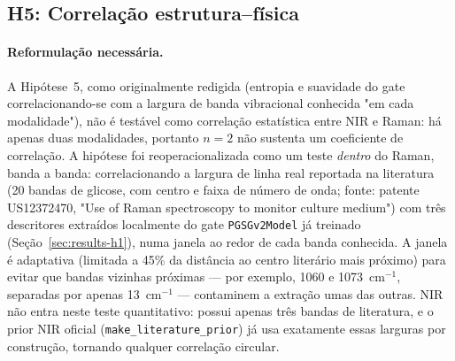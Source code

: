 %
%

\subsection{H5: Correlação estrutura--física}
\label{sec:results-h5}

\paragraph{Reformulação necessária.} A Hipótese~5, como originalmente redigida (entropia e suavidade do gate correlacionando-se com a largura de banda vibracional conhecida "em cada modalidade"), não é testável como correlação estatística entre NIR e Raman: há apenas duas modalidades, portanto $n=2$ não sustenta um coeficiente de correlação. A hipótese foi reoperacionalizada como um teste \emph{dentro} do Raman, banda a banda: correlacionando a largura de linha real reportada na literatura (20 bandas de glicose, com centro e faixa de número de onda; fonte: patente US12372470, "Use of Raman spectroscopy to monitor culture medium") com três descritores extraídos localmente do gate \texttt{PGSGv2Model} já treinado (Seção~\ref{sec:results-h1}), numa janela ao redor de cada banda conhecida. A janela é adaptativa (limitada a 45\% da distância ao centro literário mais próximo) para evitar que bandas vizinhas próximas --- por exemplo, 1060 e 1073~cm$^{-1}$, separadas por apenas 13~cm$^{-1}$ --- contaminem a extração umas das outras. NIR não entra neste teste quantitativo: possui apenas três bandas de literatura, e o prior NIR oficial (\texttt{make\_literature\_prior}) já usa exatamente essas larguras por construção, tornando qualquer correlação circular.

